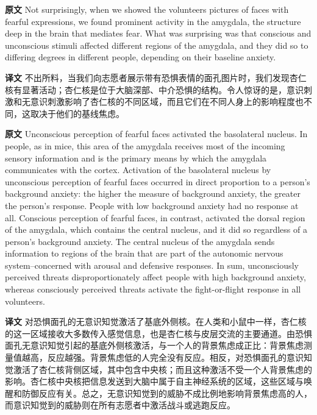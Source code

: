 \documentclass[UTF8,zihao=-4]{ctexart}
\newcommand{\BodyFont}{\fontsize{10.5pt}{15.5pt}\selectfont}
\newcommand{\origlabel}{\textbf{原文}\quad}
\newcommand{\translabel}{\textbf{译文}\quad}
\newenvironment{enblock}{\par\noindent\begingroup\BodyFont\origlabel}{\par\endgroup}
\newenvironment{zhblock}{\par\noindent\begingroup\BodyFont\translabel}{\par\endgroup\vspace{0.35em}}
\begin{document}
\begin{enblock}
Not surprisingly, when we showed the volunteers pictures of faces with fearful expressions, we found prominent activity in the amygdala, the structure deep in the brain that mediates fear. What was surprising was that conscious and unconscious stimuli affected different regions of the amygdala, and they did so to differing degrees in different people, depending on their baseline anxiety.
\end{enblock}
\begin{zhblock}
不出所料，当我们向志愿者展示带有恐惧表情的面孔图片时，我们发现杏仁核有显著活动；杏仁核是位于大脑深部、中介恐惧的结构。令人惊讶的是，意识刺激和无意识刺激影响了杏仁核的不同区域，而且它们在不同人身上的影响程度也不同，这取决于他们的基线焦虑。\end{zhblock}

\begin{enblock}
Unconscious perception of fearful faces activated the basolateral nucleus. In people, as in mice, this area of the amygdala receives most of the incoming sensory information and is the primary means by which the amygdala communicates with the cortex. Activation of the basolateral nucleus by unconscious perception of fearful faces occurred in direct proportion to a person's background anxiety: the higher the measure of background anxiety, the greater the person's response. People with low background anxiety had no response at all. Conscious perception of fearful faces, in contrast, activated the dorsal region of the amygdala, which contains the central nucleus, and it did so regardless of a person's background anxiety. The central nucleus of the amygdala sends information to regions of the brain that are part of the autonomic nervous system--concerned with arousal and defensive responses. In sum, unconsciously perceived threats disproportionately affect people with high background anxiety, whereas consciously perceived threats activate the fight-or-flight response in all volunteers.
\end{enblock}
\begin{zhblock}
对恐惧面孔的无意识知觉激活了基底外侧核。在人类和小鼠中一样，杏仁核的这一区域接收大多数传入感觉信息，也是杏仁核与皮层交流的主要通道。由恐惧面孔无意识知觉引起的基底外侧核激活，与一个人的背景焦虑成正比：背景焦虑测量值越高，反应越强。背景焦虑低的人完全没有反应。相反，对恐惧面孔的意识知觉激活了杏仁核背侧区域，其中包含中央核；而且这种激活不受一个人背景焦虑的影响。杏仁核中央核把信息发送到大脑中属于自主神经系统的区域，这些区域与唤醒和防御反应有关。总之，无意识知觉到的威胁不成比例地影响背景焦虑高的人，而意识知觉到的威胁则在所有志愿者中激活战斗或逃跑反应。\end{zhblock}
\end{document}
